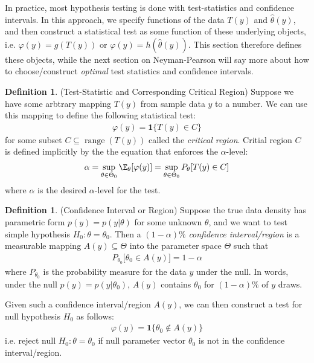 \documentclass[12pt]{article}
\theoremstyle{plain}
\theoremstyle{definition}
\newtheorem{defn}[thm]{Definition}
\theoremstyle{remark}
\newcommand{\range}{\operatorname{range}}
\begin{document}
In practice, most hypothesis testing is done with test-statistics and
confidence intervals. In this approach, we specify functions of the data
$T(y)$ and $\hat{\theta}(y)$, and then construct a statistical test as
some function of these underlying objects, i.e.  $\varphi(y)=g(T(y))$ or
$\varphi(y)=h(\hat{\theta}(y))$.
This section therefore defines these objects, while the next section on
Neyman-Pearson will say more about how to choose/construct
\emph{optimal} test statistics and confidence intervals.


\begin{defn}(Test-Statistic and Corresponding Critical Region)
Suppose we have some arbtrary mapping $T(y)$ from sample data $y$
to a number.
We can use this mapping to define the following statistical test:
\begin{align*}
  \varphi(y)
  = \mathbf{1}\{T(y)\in C\}
\end{align*}
for some subset $C\subseteq\range(T(y))$ called the
\emph{critical region}. Critial region $C$ is defined implicitly by the
the equation that enforces the $\alpha$-level:
\begin{align}
  \alpha
  = \sup_{\theta\in\Theta_0}\E_\theta[\varphi(y)]
  = \sup_{\theta\in\Theta_0}
    P_\theta[T(y)\in C]
\end{align}
where $\alpha$ is the desired $\alpha$-level for the test.
\end{defn}


\begin{defn}(Confidence Interval or Region)
Suppose the true data density has parametric form $p(y)=p(y|\theta)$ for
some unknown $\theta$, and we want to test simple hypothesis
$H_0:\theta=\theta_0$. Then a $(1-\alpha)\%$
\emph{confidence interval/region} is a measurable mapping
$A(y)\subseteq\Theta$ into the parameter space $\Theta$ such that
\begin{align*}
  P_{\theta_0}\big[\theta_0 \in A(y)\big]
  =
  1-\alpha
\end{align*}
where $P_{\theta_0}$ is the probability measure for the data $y$ under
the null.
In words, under the null $p(y)=p(y|\theta_0)$, $A(y)$ contains
$\theta_0$ for $(1-\alpha)\%$ of $y$ draws.

Given such a confidence interval/region $A(y)$, we can then
construct a test for null hypothesis $H_0$ as follows:
\begin{align*}
  \varphi(y)
  = \mathbf{1}\big\{\theta_0\not\in A(y)\big\}
\end{align*}
i.e. reject null $H_0:\theta=\theta_0$ if null parameter vector
$\theta_0$ is not in the confidence interval/region.
\end{defn}
\end{document}

